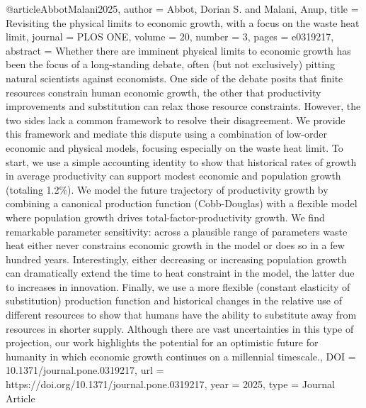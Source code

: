 
@article{AbbotMalani2025,
   author = {Abbot, Dorian S. and Malani, Anup},
   title = {Revisiting the physical limits to economic growth, with a focus on the waste heat limit},
   journal = {PLOS ONE},
   volume = {20},
   number = {3},
   pages = {e0319217},
   abstract = {Whether there are imminent physical limits to economic growth has been the focus of a long-standing debate, often (but not exclusively) pitting natural scientists against economists. One side of the debate posits that finite resources constrain human economic growth, the other that productivity improvements and substitution can relax those resource constraints. However, the two sides lack a common framework to resolve their disagreement. We provide this framework and mediate this dispute using a combination of low-order economic and physical models, focusing especially on the waste heat limit. To start, we use a simple accounting identity to show that historical rates of growth in average productivity can support modest economic and population growth (totaling 1.2\%). We model the future trajectory of productivity growth by combining a canonical production function (Cobb-Douglas) with a flexible model where population growth drives total-factor-productivity growth. We find remarkable parameter sensitivity: across a plausible range of parameters waste heat either never constrains economic growth in the model or does so in a few hundred years. Interestingly, either decreasing or increasing population growth can dramatically extend the time to heat constraint in the model, the latter due to increases in innovation. Finally, we use a more flexible (constant elasticity of substitution) production function and historical changes in the relative use of different resources to show that humans have the ability to substitute away from resources in shorter supply. Although there are vast uncertainties in this type of projection, our work highlights the potential for an optimistic future for humanity in which economic growth continues on a millennial timescale.},
   DOI = {10.1371/journal.pone.0319217},
   url = {https://doi.org/10.1371/journal.pone.0319217},
   year = {2025},
   type = {Journal Article}
}


